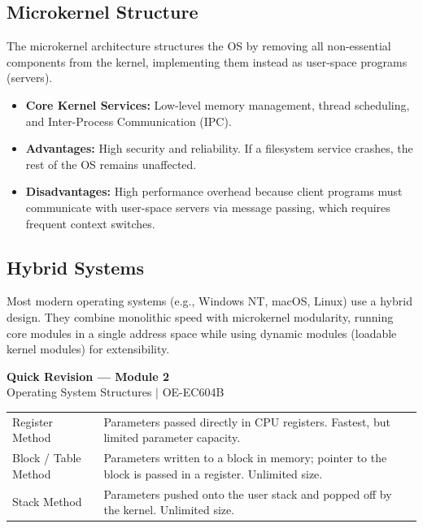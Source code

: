 \documentclass[12pt,a4paper]{article}
\renewcommand{\arraystretch}{1.45}
\begin{document}
\subsection{Microkernel Structure}
The microkernel architecture structures the OS by removing all non-essential components from the kernel, implementing them instead as user-space programs (servers).
\begin{itemize}[leftmargin=*, itemsep=3pt]
  \item \textbf{Core Kernel Services:} Low-level memory management, thread scheduling, and Inter-Process Communication (IPC).
  \item \textbf{Advantages:} High security and reliability. If a filesystem service crashes, the rest of the OS remains unaffected.
  \item \textbf{Disadvantages:} High performance overhead because client programs must communicate with user-space servers via message passing, which requires frequent context switches.
\end{itemize}

\subsection{Hybrid Systems}
Most modern operating systems (e.g., Windows NT, macOS, Linux) use a hybrid design. They combine monolithic speed with microkernel modularity, running core modules in a single address space while using dynamic modules (loadable kernel modules) for extensibility.

\newpage
\begin{center}
  {\large\bfseries\color{myred} Quick Revision --- Module 2}\\[3pt]
  {\small\color{mydark} Operating System Structures $|$ OE-EC604B}
\end{center}
\noindent{\color{myred}\rule{\linewidth}{1.2pt}}
\vspace{4pt}

\begin{tcolorbox}[formulabox, title={\textbf{System Call Parameter Passing Methods}}]
\renewcommand{\arraystretch}{1.3}
\begin{tabularx}{\linewidth}{B{3.5cm} X}
Register Method & Parameters passed directly in CPU registers. Fastest, but limited parameter capacity. \\[4pt]
Block / Table Method & Parameters written to a block in memory; pointer to the block is passed in a register. Unlimited size. \\[4pt]
Stack Method & Parameters pushed onto the user stack and popped off by the kernel. Unlimited size.
\end{tabularx}
\end{tcolorbox}
\end{document}
